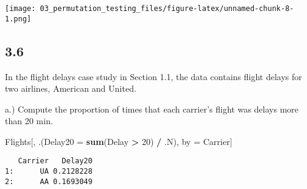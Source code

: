\documentclass[
  12pt,
]{report}
\newenvironment{Shaded}{\begin{snugshade}}{\end{snugshade}}
\newcommand{\DataTypeTok}[1]{\textcolor[rgb]{0.13,0.29,0.53}{#1}}
\newcommand{\DecValTok}[1]{\textcolor[rgb]{0.00,0.00,0.81}{#1}}
\newcommand{\KeywordTok}[1]{\textcolor[rgb]{0.13,0.29,0.53}{\textbf{#1}}}
\newcommand{\NormalTok}[1]{#1}
\newcommand{\OperatorTok}[1]{\textcolor[rgb]{0.81,0.36,0.00}{\textbf{#1}}}
\newcommand{\StringTok}[1]{\textcolor[rgb]{0.31,0.60,0.02}{#1}}
\begin{document}
\texttt{[image: 03\_permutation\_testing\_files/figure-latex/unnamed-chunk-8-1.png]}

\hypertarget{section-5}{%
\subsection{3.6}\label{section-5}}

In the flight delays case study in Section 1.1, the data contains flight
delays for two airlines, American and United.

a.) Compute the proportion of times that each carrier's flight was
delays more than 20 min.

\begin{Shaded}
\begin{Highlighting}[]
\NormalTok{Flights[, .(}\DataTypeTok{Delay20 =} \KeywordTok{sum}\NormalTok{(Delay }\OperatorTok{>}\StringTok{ }\DecValTok{20}\NormalTok{) }\OperatorTok{/}\StringTok{ }\NormalTok{.N), by =}\StringTok{ }\NormalTok{Carrier]}
\end{Highlighting}
\end{Shaded}

\begin{verbatim}
   Carrier   Delay20
1:      UA 0.2128228
2:      AA 0.1693049
\end{verbatim}
\end{document}
